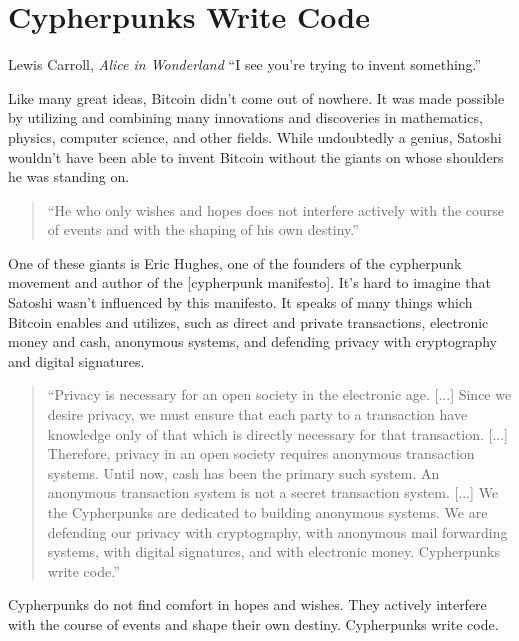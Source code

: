 \chapter{ Cypherpunks Write Code}
\label{les:20}

\begin{chapquote}{Lewis Carroll, \textit{Alice in Wonderland}}
``I see you're trying to invent something.''
\end{chapquote}

Like many great ideas, Bitcoin didn't come out of nowhere. It was made
possible by utilizing and combining many innovations and discoveries in
mathematics, physics, computer science, and other fields. While
undoubtedly a genius, Satoshi wouldn't have been able to invent Bitcoin
without the giants on whose shoulders he was standing on.

\begin{quotation}
``He who only wishes and hopes does not interfere actively with the
course of events and with the shaping of his own destiny.''
\end{quotation}

One of these giants is Eric Hughes, one of the founders of the
cypherpunk movement and author of the [cypherpunk manifesto]. It's hard
to imagine that Satoshi wasn't influenced by this manifesto. It speaks
of many things which Bitcoin enables and utilizes, such as direct and
private transactions, electronic money and cash, anonymous systems, and
defending privacy with cryptography and digital signatures.

\begin{quotation}
``Privacy is necessary for an open society in the electronic age.
[...] Since we desire privacy, we must ensure that each party to a
transaction have knowledge only of that which is directly necessary
for that transaction. [...]
Therefore, privacy in an open society requires anonymous transaction
systems. Until now, cash has been the primary such system. An
anonymous transaction system is not a secret transaction system.
[...]
We the Cypherpunks are dedicated to building anonymous systems. We are
defending our privacy with cryptography, with anonymous mail
forwarding systems, with digital signatures, and with electronic
money.
Cypherpunks write code.''
\end{quotation}

Cypherpunks do not find comfort in hopes and wishes. They actively
interfere with the course of events and shape their own destiny.
Cypherpunks write code.

